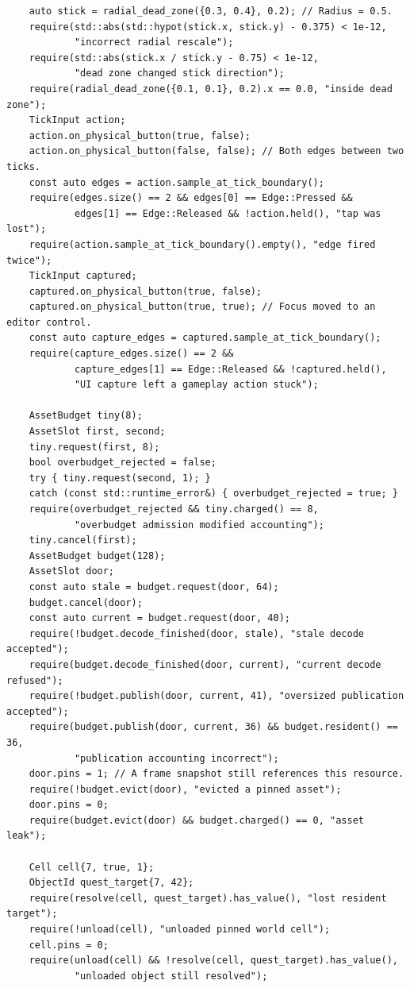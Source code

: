 \begin{verbatim}
    auto stick = radial_dead_zone({0.3, 0.4}, 0.2); // Radius = 0.5.
    require(std::abs(std::hypot(stick.x, stick.y) - 0.375) < 1e-12,
            "incorrect radial rescale");
    require(std::abs(stick.x / stick.y - 0.75) < 1e-12,
            "dead zone changed stick direction");
    require(radial_dead_zone({0.1, 0.1}, 0.2).x == 0.0, "inside dead zone");
    TickInput action;
    action.on_physical_button(true, false);
    action.on_physical_button(false, false); // Both edges between two ticks.
    const auto edges = action.sample_at_tick_boundary();
    require(edges.size() == 2 && edges[0] == Edge::Pressed &&
            edges[1] == Edge::Released && !action.held(), "tap was lost");
    require(action.sample_at_tick_boundary().empty(), "edge fired twice");
    TickInput captured;
    captured.on_physical_button(true, false);
    captured.on_physical_button(true, true); // Focus moved to an editor control.
    const auto capture_edges = captured.sample_at_tick_boundary();
    require(capture_edges.size() == 2 &&
            capture_edges[1] == Edge::Released && !captured.held(),
            "UI capture left a gameplay action stuck");

    AssetBudget tiny(8);
    AssetSlot first, second;
    tiny.request(first, 8);
    bool overbudget_rejected = false;
    try { tiny.request(second, 1); }
    catch (const std::runtime_error&) { overbudget_rejected = true; }
    require(overbudget_rejected && tiny.charged() == 8,
            "overbudget admission modified accounting");
    tiny.cancel(first);
    AssetBudget budget(128);
    AssetSlot door;
    const auto stale = budget.request(door, 64);
    budget.cancel(door);
    const auto current = budget.request(door, 40);
    require(!budget.decode_finished(door, stale), "stale decode accepted");
    require(budget.decode_finished(door, current), "current decode refused");
    require(!budget.publish(door, current, 41), "oversized publication accepted");
    require(budget.publish(door, current, 36) && budget.resident() == 36,
            "publication accounting incorrect");
    door.pins = 1; // A frame snapshot still references this resource.
    require(!budget.evict(door), "evicted a pinned asset");
    door.pins = 0;
    require(budget.evict(door) && budget.charged() == 0, "asset leak");

    Cell cell{7, true, 1};
    ObjectId quest_target{7, 42};
    require(resolve(cell, quest_target).has_value(), "lost resident target");
    require(!unload(cell), "unloaded pinned world cell");
    cell.pins = 0;
    require(unload(cell) && !resolve(cell, quest_target).has_value(),
            "unloaded object still resolved");


\end{verbatim}

